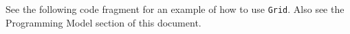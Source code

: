

See the following code fragment for an example of
how to use {\tt Grid}.  Also see
the Programming Model section of this document.



